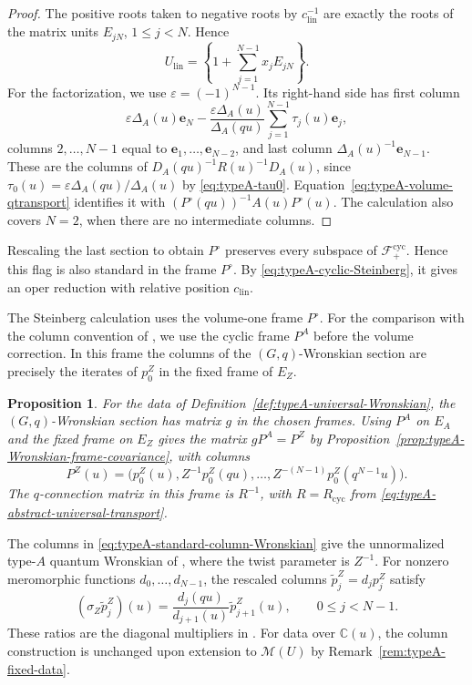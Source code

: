 \documentclass[11pt,leqno]{amsart}
\numberwithin{equation}{section}
\theoremstyle{plain}
\newtheorem{proposition}[theorem]{Proposition}
\theoremstyle{definition}
\theoremstyle{plain}
\theoremstyle{definition}
\theoremstyle{remark}
\begin{document}
\begin{proof}
The positive roots taken to negative roots by $c_{\mathrm{lin}}^{-1}$ are exactly the roots of the matrix units $E_{jN}$, $1\le j<N$.  Hence
\[
 U_{\mathrm{lin}}
   =\left\{1+\sum_{j=1}^{N-1}x_jE_{jN}\right\}.
\]
For the factorization, we use $\varepsilon=(-1)^{N-1}$.
Its right-hand side has first column
\[
 \varepsilon \Delta_A(u)\mathbf e_N
   -\frac{\varepsilon \Delta_A(u)}{\Delta_A(qu)}
                \sum_{j=1}^{N-1}\tau_j(u)\mathbf e_j,
\]
columns $2,\ldots,N-1$ equal to $\mathbf e_1,\ldots,\mathbf e_{N-2}$, and last column
$\Delta_A(u)^{-1}\mathbf e_{N-1}$.  These are the columns of
$D_A(qu)^{-1}R(u)^{-1}D_A(u)$, since
$\tau_0(u)=\varepsilon \Delta_A(qu)/\Delta_A(u)$ by
\eqref{eq:typeA-tau0}.  Equation~\eqref{eq:typeA-volume-qtransport} identifies it with $(P^\circ(qu))^{-1}A(u)P^\circ(u)$.  The calculation also covers $N=2$, when there are no intermediate columns.
\end{proof}

Rescaling the last section to obtain $P^\circ$ preserves every subspace of $\mathcal F_+^{\mathrm{cyc}}$.  Hence this flag is also standard in the frame $P^\circ$.  By \eqref{eq:typeA-cyclic-Steinberg}, it gives an oper reduction with relative position $c_{\mathrm{lin}}$.

The Steinberg calculation uses the volume-one frame $P^\circ$. For the comparison with the column convention of \cite[\S4.1--4.2]{KSZ2021}, we use the cyclic frame $P^A$ before the volume correction. In this frame the columns of the $(G,q)$-Wronskian section are precisely the iterates of $p_0^Z$ in the fixed frame of $E_Z$.
\begin{proposition}
\label{prop:typeA-standard-Wronskian-comparison}
For the data of Definition~\ref{def:typeA-universal-Wronskian}, the $(G,q)$-Wronskian section has matrix $g$ in the chosen frames. Using $P^A$ on $E_A$ and the fixed frame on $E_Z$ gives the matrix $gP^A=P^Z$ by Proposition~\ref{prop:typeA-Wronskian-frame-covariance}, with columns
\begin{equation}\label{eq:typeA-standard-column-Wronskian}
 P^Z(u)
  =\bigl(p_0^Z(u),Z^{-1}p_0^Z(qu),\ldots,
                 Z^{-(N-1)}p_0^Z(q^{N-1}u)\bigr).
\end{equation}
The $q$-connection matrix in this frame is $R^{-1}$, with $R=R_{\mathrm{cyc}}$ from \eqref{eq:typeA-abstract-universal-transport}.
\end{proposition}

The columns in \eqref{eq:typeA-standard-column-Wronskian} give the unnormalized type-$A$ quantum Wronskian of \cite[Eqs.~(4.2), (4.6)--(4.8)]{KSZ2021}, where the twist parameter is $Z^{-1}$.  For nonzero meromorphic functions $d_0,\ldots,d_{N-1}$, the rescaled columns $\widetilde p_j^Z=d_jp_j^Z$ satisfy
\[
 (\sigma_Z\widetilde p_j^Z)(u)
 =\frac{d_j(qu)}{d_{j+1}(u)}\widetilde p_{j+1}^Z(u),
 \qquad 0\le j<N-1.
\]
These ratios are the diagonal multipliers in \cite[\S4.5, Eq.~(4.43)]{KZ2021}.  For data over $\mathbb C(u)$, the column construction is unchanged upon extension to $\mathcal M(U)$ by Remark~\ref{rem:typeA-fixed-data}.
\end{document}
